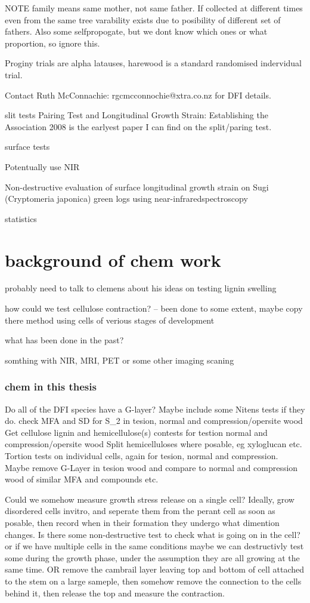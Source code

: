 \documentclass{article}
\begin{document}
NOTE family means same mother, not same father.
If collected at different times even from the same tree varability exists due
to posibility of different set of fathers. Also some selfpropogate, but we dont
know which ones or what proportion, so ignore this.

Proginy trials are alpha latauses, harewood is a standard randomised indervidual trial.

Contact Ruth McConnachie: rgcmcconnochie@xtra.co.nz for DFI details.

slit tests
Pairing Test and Longitudinal Growth Strain: Establishing the Association 2008
is the earlyest paper I can find on the split/paring test.

surface tests

Potentually use NIR

Non-destructive evaluation of surface longitudinal growth strain
on Sugi (Cryptomeria japonica) green logs using near-infraredspectroscopy

statistics

\section{background of chem work}

probably need to talk to clemens about his ideas on testing lignin swelling

how could we test cellulose contraction? -- been done to some extent, maybe copy there method using cells of verious stages of development

what has been done in the past?

somthing with NIR, MRI, PET or some other imaging scaning

\subsubsection{chem in this thesis}

Do all of the DFI species have a G-layer?
Maybe include some Nitens tests if they do.
check MFA and SD for S\_2 in tesion, normal and compression/opersite wood
Get cellulose lignin and hemicellulose(s) contests for testion normal and compression/opersite wood
    Split hemicelluloses where posable, eg xyloglucan etc.
Tortion tests on individual cells, again for tesion, normal and compression. Maybe remove G-Layer in tesion wood and compare to normal and compression wood of similar MFA and compounds etc.

Could we somehow measure growth stress release on a single cell?
Ideally, grow disordered cells invitro, and seperate them from the perant cell as soon as posable, then record when in their formation they undergo what dimention changes. Is there some non-destructive test to check what is going on in the cell? or if we have multiple cells in the same conditions maybe we can destructivly test some during the growth phase, under the assumption they are all growing at the same time.
OR
remove the cambrail layer leaving top and bottom of cell attached to the stem on a large sameple, then somehow remove the connection to the cells behind it, then release the top and measure the contraction.
\end{document}
